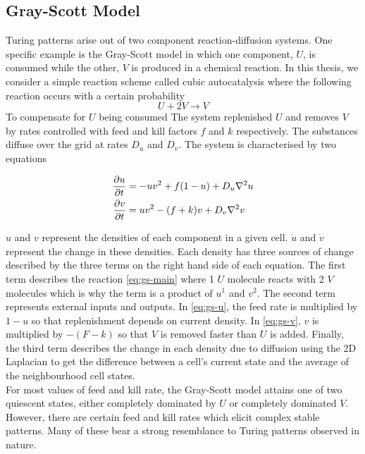 \subsection{Gray-Scott Model}

Turing patterns arise out of two component reaction-diffusion systems. One specific example is the Gray-Scott model\cite{gray1983autocatalytic} in which one component, $U$, is consumed while the other, $V$ is produced in a chemical reaction. In this thesis, we consider a simple reaction scheme called cubic autocatalysis where the following reaction occurs with a certain probability
\begin{equation}\label{eq:gs-main}
  U + 2V \rightarrow V
\end{equation}
To compensate for $U$ being consumed The system replenished $U$ and removes $V$ by rates controlled with feed and kill factors $f$ and $k$ respectively. The substances diffuse over the grid at rates $D_u$ and $D_v$. The system is characterised by two equations
\begin{definition} \label{def:reaction-diffusion}
\begin{align} 
  \label{eq:gs-u} \pdv{u}{t} &= -uv^2 + f(1-u) + D_u \nabla^2 u\\
  \label{eq:gs-v} \pdv{v}{t} &= uv^2 - (f+k)v + D_v \nabla^2 v
\end{align}
\end{definition}
$u$ and $v$ represent the densities of each component in a given cell. $\dot{u}$ and $\dot{v}$ represent the change in these densities. Each density has three sources of change described by the three terms on the right hand side of each equation. The first term describes the reaction \ref{eq:gs-main} where 1 $U$ molecule reacts with 2 $V$ molecules which is why the term is a product of $u^1$ and $v^2$. The second term represents external inputs and outputs. In \ref{eq:gs-u}, the feed rate is multiplied by $1-u$ so that replenishment depends on current density. In \ref{eq:gs-v}, $v$ is multiplied by $-(F-k)$ so that $V$ is removed faster than $U$ is added. Finally, the third term describes the change in each density due to diffusion using the 2D Laplacian to get the difference between a cell's current state and the average of the neighbourhood cell states.\\

For most values of feed and kill rate, the Gray-Scott model attains one of two quiescent states, either completely dominated by $U$ or completely dominated $V$. However, there are certain feed and kill rates which elicit complex stable patterns. Many of these bear a strong resemblance to Turing patterns observed in nature.

